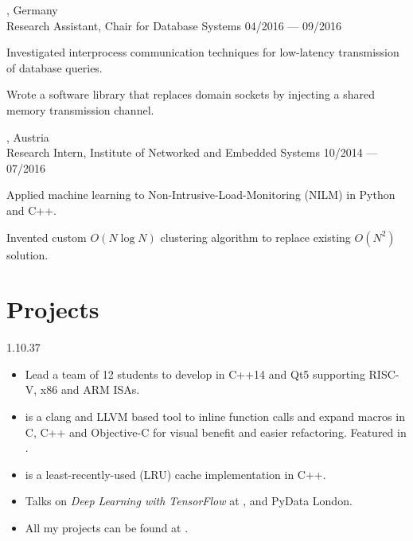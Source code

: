 \begin{entry}
  {, Germany}
	{\\Research Assistant, Chair for Database Systems}
	{04/2016 --- 09/2016}
  \vspace{-1mm}
  \item Investigated interprocess communication techniques for low-latency transmission of database queries.
  \item Wrote a software library that replaces domain sockets by injecting a shared memory transmission channel.
\end{entry}

\begin{entry}
  {, Austria}
	{\\Research Intern, Institute of Networked and Embedded Systems}
	{10/2014 --- 07/2016}
  \vspace{-1mm}
  \item Applied machine learning to Non-Intrusive-Load-Monitoring (NILM) in Python and C++.
	\item Invented custom $O(N \log N)$ clustering algorithm to replace existing $O(N^2)$ solution.
\end{entry}
\vspace{-1mm}

\section{Projects}{1.1}{0.37}
\vspace{-4mm}
\begin{itemize}
  \item Lead a team of 12 students to develop  in C++14 and Qt5 supporting RISC-V, x86 and ARM ISAs.
  \item {} is a clang and LLVM based tool to inline function calls and expand macros in C, C++ and Objective-C for visual benefit and easier refactoring. Featured in .
  \item {} is a least-recently-used (LRU) cache implementation in C++.
  \item Talks on \emph{Deep Learning with TensorFlow} at ,  and PyData London.
  \item All my projects can be found at
	.
\end{itemize}

